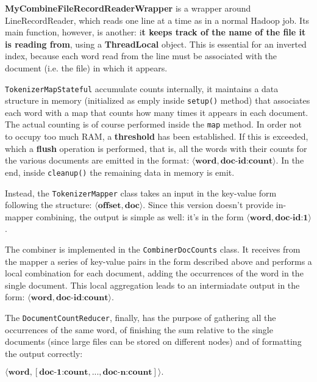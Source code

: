 \textbf{MyCombineFileRecordReaderWrapper} is a wrapper around LineRecordReader, which reads one line at a time as in a normal Hadoop job. Its main function, however, is another: i\textbf{t keeps track of the name of the file it is reading from}, using a \textbf{ThreadLocal} object. This is essential for an inverted index, because each word read from the line must be associated with the document (i.e. the file) in which it appears. 

\texttt{TokenizerMapStateful} accumulate counts internally, it maintains a data structure in memory (initialized as emply inside \texttt{setup()} method) that associates each word with a map that counts how many times it appears in each document. The actual counting is of course performed inside the \texttt{map} method. In order not to occupy too much RAM, a \textbf{threshold} has been established. If this is exceeded, which a \textbf{flush} operation is performed, that is, all the words with their counts for the various documents are emitted in the format: $ \langle \textbf{word}, \textbf{doc-id:count} \rangle $. In the end, inside \texttt{cleanup()} the remaining data in memory is emit.

Instead, the \texttt{TokenizerMapper} class takes an input in the key-value form following the structure: $\langle \textbf{offset}, \textbf{doc}\rangle $. Since this version doesn't provide in-mapper combining, the output is simple as well: it's in the form $ \langle \textbf{word}, \textbf{doc-id:1} \rangle $. 

The combiner is implemented in the \texttt{CombinerDocCounts} class. It receives from the mapper a series of key-value pairs in the form described above and performs a local combination for each document, adding the occurrences of the word in the single document. This local aggregation leads to an intermiadate output in the form: $ \langle \textbf{word}, \textbf{doc-id:count} \rangle $.

The \texttt{DocumentCountReducer}, finally, has the purpose of gathering all the occurrences of the same word, of finishing the sum relative to the single documents (since large files can be stored on different nodes) and of formatting the output correctly: 

$ \langle \textbf{word}, [\textbf{doc-1:count}, ..., \textbf{doc-n:count}] \rangle. $

